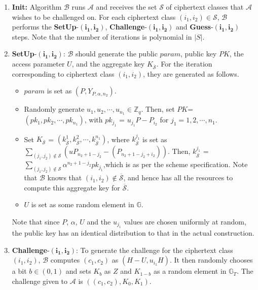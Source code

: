 \begin{enumerate}
 \item \textbf{Init:} Algorithm $\mathcal{B}$ runs $\mathcal{A}$ and receives the set $\mathcal{S}$ of ciphertext classes that $\mathcal{A}$ wishes to be challenged on. For each ciphertext class $(i_1,i_2)\in\mathcal{S}$, $\mathcal{B}$ performs the \textbf{SetUp}-$\mathbf{(i_1,i_2)}$, \textbf{Challenge}-$\mathbf{(i_1,i_2)}$ and \textbf{Guess}-$\mathbf{(i_1,i_2)}$ steps. Note that the number of iterations is polynomial in $|S|$. 
 
 \item \textbf{SetUp}-$\mathbf{(i_1,i_2)}$: $\mathcal{B}$ should generate the public $param$, public key $PK$, the access parameter $U$, and the aggregate key $K_{\overline{\mathcal{S}}}$. For the iteration corresponding to ciphertext class $(i_1,i_2)$, they are generated as follows.
 \begin{itemize}
  \item $param$ is set as $(P,Y_{P,\alpha,n_2})$.
  \item Randomly generate $u_1,u_2,\cdots,u_{n_1} \in \mathbb{Z}_q$. Then, set $PK$=\\$(pk_1,pk_2,\cdots,pk_{n_1})$, with $pk_{j_1}$ = $u_{j_1}P - P_{i_2}$ for $j_1=1,2,\cdots,n_1$.
  \item Set $K_{\overline{\mathcal{S}}}$ = $(k^{1}_{\overline{\mathcal{S}}},k^{2}_{\overline{\mathcal{S}}},\cdots,k^{n_1}_{\overline{\mathcal{S}}})$, where $k^{j_1}_{\overline{\mathcal{S}}}$ is set as $\sum_{(j_1,j_2)\notin\mathcal{S}}({u}P_{n_2+1-j_2}-(P_{n_2+1-j_2+i_2}))$. Then, $k^{j_1}_{\overline{\mathcal{S}}}$ = $\sum_{(j_1,j_2)\notin\mathcal{S}}\alpha^{n_2+1-j_2}pk_{j_1}$,which is as per the scheme specification. Note that $\mathcal{B}$ knows that $(i_1,i_2)\notin \overline{\mathcal{S}}$, and hence has all the resources to compute this aggregate key for $\overline{\mathcal{S}}$. 
  \item $U$ is set as some random element in $\mathbb{G}$.
 \end{itemize}
 
 Note that since $P$, $\alpha$, $U$ and the $u_{j_1}$ values are chosen uniformly at random, the public key has an identical distribution to that in the actual construction.
 
 \item \textbf{Challenge}-$\mathbf{(i_1,i_2)}$: To generate the challenge for the ciphertext class $(i_1,i_2)$, $\mathcal{B}$ computes $(c_1,c_2)$ as $(H-U,u_{i_1}H)$. It then randomly chooses a bit $b\in{(0,1)}$ and sets $K_b$ as $Z$ and $K_{1-b}$ as a random element in $\mathbb{G}_T$. The challenge given to $\mathcal{A}$ is $((c_1,c_2),K_0,K_1)$. 
 

\end{enumerate}
